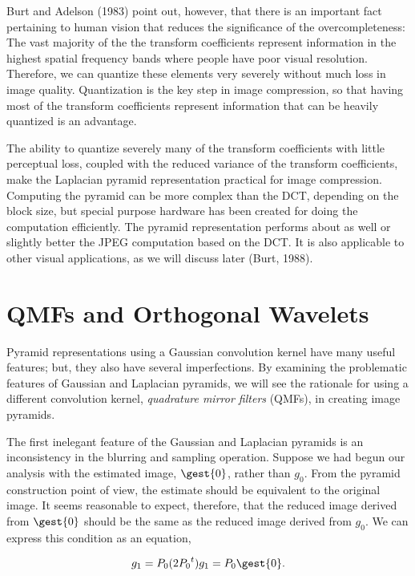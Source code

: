 Burt and Adelson (1983) point out, however, that there is an important
fact pertaining to human vision that reduces the significance of the
overcompleteness: The vast majority of the the transform coefficients
represent information in the highest spatial frequency bands where
people have poor visual resolution.  Therefore, we can quantize these
elements very severely without much loss in image quality.
Quantization is the key step in image compression, so that having most
of the transform coefficients represent information that can be
heavily quantized is an advantage.

The ability to quantize severely many of the transform coefficients
with little perceptual loss, coupled with the reduced variance of the
transform coefficients, make the Laplacian pyramid representation
practical for image compression.  Computing the pyramid can be more
complex than the DCT, depending on the block size, but special purpose
hardware has been created for doing the computation efficiently.  The
pyramid representation performs about as well or slightly better the
JPEG computation based on the DCT.  It is also applicable to other
visual applications, as we will discuss later (Burt, 1988).

\section{QMFs and Orthogonal Wavelets}
\label{sec6:qmfs}

Pyramid representations using a Gaussian convolution kernel have many
useful features; but, they also have several imperfections.  By
examining the problematic features of Gaussian and Laplacian pyramids,
we will see the rationale for using a different convolution kernel,
{\em quadrature mirror filters} (QMFs), in creating image pyramids.

The first inelegant feature of the Gaussian and Laplacian pyramids is an
inconsistency in the blurring and sampling operation.  Suppose we had
begun our analysis with the estimated image, $\gest{0}$, rather
than $g_0$.  From the pyramid construction point of view, the estimate
should be equivalent to the original image.  It seems reasonable to
expect, therefore, that the reduced image derived from $\gest{0}$
should be the same as the reduced image derived from ${g_0}$.  We can
express this condition as an equation,

\begin{equation}
\label{e7:ortho}
g_1 = P_0 (2 {P_0}^t) g_1 = P_0 \gest{0} .
\end{equation}

